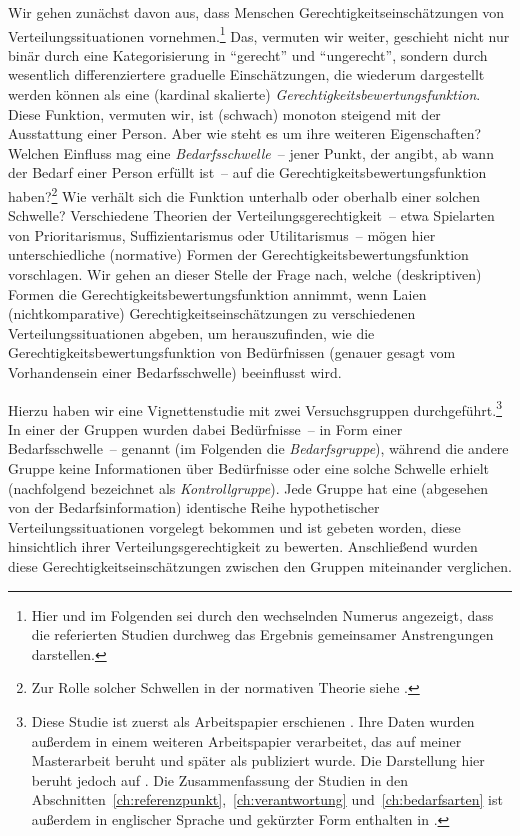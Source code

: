 \documentclass[justified,nobib,nohyper,symmetric,twoside]{tufte-book}
\begin{document}
Wir gehen zunächst davon aus, dass Menschen Gerechtigkeitsein\-schätzungen von Verteilungssituationen vornehmen.\footnote{Hier und im Folgenden sei durch den wechselnden Numerus angezeigt, dass die referierten Studien durchweg das Ergebnis gemeinsamer Anstrengungen darstellen.}
Das, vermuten wir weiter, geschieht nicht nur binär durch eine Kategorisierung in \enquote{gerecht} und \enquote{ungerecht}, sondern durch wesentlich differenziertere graduelle Einschätzungen, die wiederum dargestellt werden können als eine (kardinal skalierte) \textit{Gerechtigkeitsbewertungsfunktion}.
Diese Funktion, vermuten wir, ist (schwach) monoton steigend mit der Ausstattung einer Person.
Aber wie steht es um ihre weiteren Eigenschaften?
Welchen Einfluss mag eine \textit{Bedarfsschwelle}~-- jener Punkt, der angibt, ab wann der Bedarf einer Person erfüllt ist~-- auf die Gerechtigkeitsbewertungsfunk\-tion haben?\footnote{Zur Rolle solcher Schwellen in der normativen Theorie siehe \citet{timmer_thresholds_2021}.}
Wie verhält sich die Funktion unterhalb oder oberhalb einer solchen Schwelle?
Verschiedene Theorien der Verteilungsgerechtigkeit~-- etwa Spielarten von Prioritarismus, Suffizientarismus oder Utilitarismus~-- mögen hier unterschiedliche (normative) Formen der Gerechtigkeitsbewertungsfunktion vorschlagen.
Wir gehen an dieser Stelle der Frage nach, welche (deskriptiven) Formen die Gerechtigkeitsbewertungsfunktion annimmt, wenn Laien (nichtkomparative) Gerechtigkeitseinschätzungen zu verschiedenen Verteilungs\-situationen abgeben, um herauszufinden, wie die Gerechtigkeitsbewertungsfunktion von Bedürfnissen (genauer gesagt vom Vorhandensein einer Bedarfsschwelle) beeinflusst wird.

Hierzu haben wir eine Vignettenstudie mit zwei Versuchsgruppen durchgeführt.\footnote{Diese Studie ist zuerst als Arbeitspapier erschienen \citep{weiss_needs_2017}. Ihre Daten wurden außerdem in einem weiteren Arbeitspapier verarbeitet, das auf meiner Masterarbeit beruht \citep{bauer_monotonie_2018} und später als \citet{bauer_grundlegung_2019} publiziert wurde. Die Darstellung hier beruht jedoch auf \citet{bauer_needs_2023}. Die Zusammenfassung der Studien in den Abschnitten~\ref{ch:referenzpunkt},~\ref{ch:verantwortung} und~\ref{ch:bedarfsarten} ist außerdem in englischer Sprache und gekürzter Form enthalten in \citet{siebel_measuring_nd}.}
In einer der Gruppen wurden dabei Bedürfnisse~-- in Form einer Bedarfsschwelle~-- genannt (im Folgenden die \textit{Bedarfsgruppe}), während die andere Gruppe keine Informationen über Bedürfnisse oder eine solche Schwelle erhielt (nachfolgend bezeichnet als \textit{Kontrollgruppe}). Jede Gruppe hat eine (abgesehen von der Bedarfsinformation) identische Reihe hypothetischer Verteilungssituationen vorgelegt bekommen und ist gebeten worden, diese hinsichtlich ihrer Verteilungsgerechtigkeit zu bewerten.
Anschließend wurden diese Gerechtigkeitseinschätzungen zwischen den Gruppen miteinander verglichen.
\end{document}
